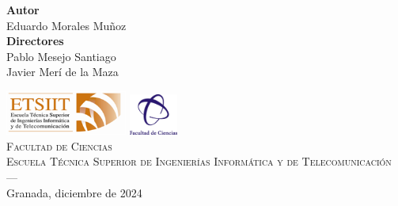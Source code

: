 \begin{titlepage}
\begin{minipage}{\textwidth}
\textbf{Autor}\\ {Eduardo Morales Muñoz}\\[2.5ex]
\textbf{Directores}\\
{Pablo Mesejo Santiago\\
Javier Merí de la Maza}\\[1cm]
\raggedright
\hspace{1.7cm}
\includegraphics[width=0.3\textwidth]{Plantilla_TFG_latex/imagenes/etsiit_logo.png} \hspace{2cm}
\includegraphics[width=0.12\textwidth]{Plantilla_TFG_latex/imagenes/fcienciasLogo.png}\\[0.1cm]
\centering
\textsc{Facultad de Ciencias \\ Escuela Técnica Superior de Ingenierías Informática y de Telecomunicación}\\
\textsc{---}\\
Granada, diciembre de 2024
\end{minipage}
\end{titlepage}


